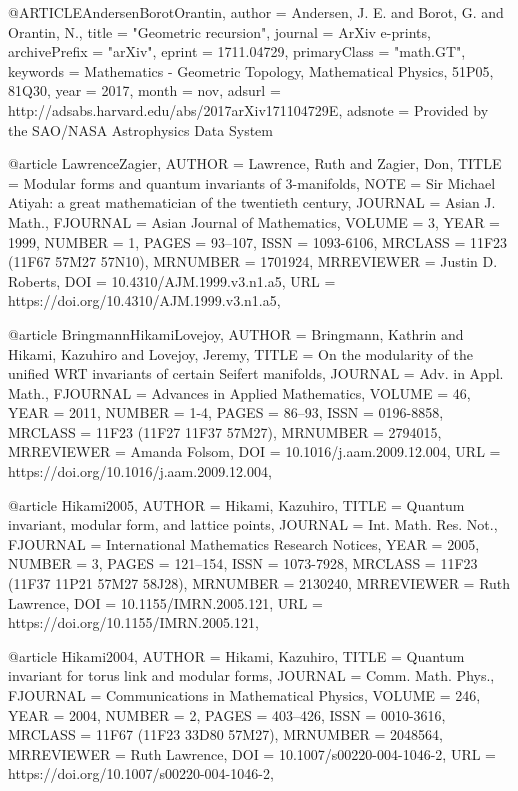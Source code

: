 @ARTICLE{AndersenBorotOrantin,
   author = {{Andersen}, J. E. and {Borot}, G. and {Orantin}, N.},
    title = "{Geometric recursion}",
  journal = {ArXiv e-prints},
archivePrefix = "arXiv",
   eprint = {1711.04729},
 primaryClass = "math.GT",
 keywords = {Mathematics - Geometric Topology, Mathematical Physics, 51P05, 81Q30},
     year = 2017,
    month = nov,
   adsurl = {http://adsabs.harvard.edu/abs/2017arXiv171104729E},
  adsnote = {Provided by the SAO/NASA Astrophysics Data System}
}

@article {LawrenceZagier,
    AUTHOR = {Lawrence, Ruth and Zagier, Don},
     TITLE = {Modular forms and quantum invariants of {$3$}-manifolds},
      NOTE = {Sir Michael Atiyah: a great mathematician of the twentieth
              century},
   JOURNAL = {Asian J. Math.},
  FJOURNAL = {Asian Journal of Mathematics},
    VOLUME = {3},
      YEAR = {1999},
    NUMBER = {1},
     PAGES = {93--107},
      ISSN = {1093-6106},
   MRCLASS = {11F23 (11F67 57M27 57N10)},
  MRNUMBER = {1701924},
MRREVIEWER = {Justin D. Roberts},
       DOI = {10.4310/AJM.1999.v3.n1.a5},
       URL = {https://doi.org/10.4310/AJM.1999.v3.n1.a5},
}

@article {BringmannHikamiLovejoy,
    AUTHOR = {Bringmann, Kathrin and Hikami, Kazuhiro and Lovejoy, Jeremy},
     TITLE = {On the modularity of the unified {WRT} invariants of certain
              {S}eifert manifolds},
   JOURNAL = {Adv. in Appl. Math.},
  FJOURNAL = {Advances in Applied Mathematics},
    VOLUME = {46},
      YEAR = {2011},
    NUMBER = {1-4},
     PAGES = {86--93},
      ISSN = {0196-8858},
   MRCLASS = {11F23 (11F27 11F37 57M27)},
  MRNUMBER = {2794015},
MRREVIEWER = {Amanda Folsom},
       DOI = {10.1016/j.aam.2009.12.004},
       URL = {https://doi.org/10.1016/j.aam.2009.12.004},
}

@article {Hikami2005,
    AUTHOR = {Hikami, Kazuhiro},
     TITLE = {Quantum invariant, modular form, and lattice points},
   JOURNAL = {Int. Math. Res. Not.},
  FJOURNAL = {International Mathematics Research Notices},
      YEAR = {2005},
    NUMBER = {3},
     PAGES = {121--154},
      ISSN = {1073-7928},
   MRCLASS = {11F23 (11F37 11P21 57M27 58J28)},
  MRNUMBER = {2130240},
MRREVIEWER = {Ruth Lawrence},
       DOI = {10.1155/IMRN.2005.121},
       URL = {https://doi.org/10.1155/IMRN.2005.121},
}

@article {Hikami2004,
    AUTHOR = {Hikami, Kazuhiro},
     TITLE = {Quantum invariant for torus link and modular forms},
   JOURNAL = {Comm. Math. Phys.},
  FJOURNAL = {Communications in Mathematical Physics},
    VOLUME = {246},
      YEAR = {2004},
    NUMBER = {2},
     PAGES = {403--426},
      ISSN = {0010-3616},
   MRCLASS = {11F67 (11F23 33D80 57M27)},
  MRNUMBER = {2048564},
MRREVIEWER = {Ruth Lawrence},
       DOI = {10.1007/s00220-004-1046-2},
       URL = {https://doi.org/10.1007/s00220-004-1046-2},
}


